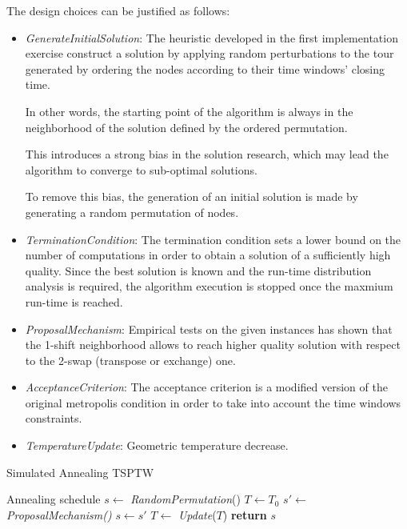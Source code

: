 \begin{homeworkProblem}
The design choices can be justified as follows:

\begin{itemize}
  \item \emph{GenerateInitialSolution}: The heuristic developed in the first implementation exercise construct a solution by applying random perturbations to the tour generated by ordering the nodes according to their time windows' closing time.
  
  In other words, the starting point of the algorithm is always in the neighborhood of the solution defined by the ordered permutation.
  
  This introduces a strong bias in the solution research, which may lead the algorithm to converge to sub-optimal solutions.
  
  To remove this bias, the generation of an initial solution is made by generating a random permutation of nodes. 
   \item \emph{TerminationCondition}: The termination condition sets a lower bound on the number of computations in order to obtain a solution of a sufficiently high quality.
  Since the best solution is known and the run-time distribution analysis is required, the algorithm execution is stopped once the maxmium run-time is reached.
  \item \emph{ProposalMechanism}: Empirical tests on the given instances has shown that the 1-shift neighborhood allows to reach higher quality solution with respect to the 2-swap (transpose or exchange) one.
  \item \emph{AcceptanceCriterion}: The acceptance criterion is a modified version of the original metropolis condition in order to take into account the time windows constraints.
  \item \emph{TemperatureUpdate}: Geometric temperature decrease.
\end{itemize}


\begin{algorithm}
\caption{Simulated Annealing TSPTW}
\label{SA:TSPTW}
\begin{algorithmic}[!h]
  \Require Annealing schedule
  \State $s \gets$ \emph{RandomPermutation}()
  \State $T \gets T_0$  
    \State $s' \gets$ \emph{ProposalMechanism()} 
      \State $s \gets s'$
    \EndIf
  \State $T \gets$ \emph{Update}($T$) 
\EndWhile
  \State \textbf{return} $s$
\EndProcedure
\end{algorithmic}
\end{algorithm}


\end{homeworkProblem}
